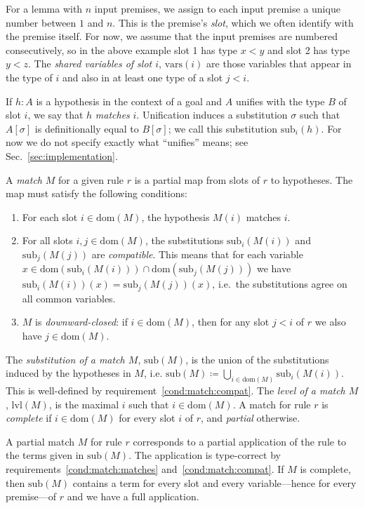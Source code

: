 \documentclass[runningheads]{llncs}
\newcommand{\vars}{\ensuremath{\mathrm{vars}}}
\newcommand{\dom}{\ensuremath{\mathrm{dom}}}
\newcommand{\sub}{\ensuremath{\mathrm{sub}}}
\newcommand{\lvl}{\ensuremath{\mathrm{lvl}}}
\begin{document}
For a lemma with $n$ input premises, we assign to each input premise a unique number between $1$ and $n$.
This is the premise's \emph{slot}, which we often identify with the premise itself.
For now, we assume that the input premises are numbered consecutively, so in the above example slot 1 has type $x < y$ and slot 2 has type $y < z$.
The \emph{shared variables of slot $i$}, $\vars(i)$ are those variables that appear in the type of $i$ and also in at least one type of a slot $j < i$.

If $h : A$ is a hypothesis in the context of a goal and $A$ unifies with the type $B$ of slot $i$, we say that $h$ \emph{matches} $i$.
Unification induces a substitution $σ$ such that $A[σ]$ is definitionally equal to $B[σ]$; we call this substitution $\sub_{i}(h)$.
For now we do not specify exactly what \enquote{unifies} means; see Sec.~\ref{sec:implementation}.

A \textit{match} $M$ for a given rule $r$ is a partial map from slots of $r$ to hypotheses.
The map must satisfy the following conditions:
\begin{enumerate}
  \item\label{cond:match:matches} For each slot $i ∈ \dom(M)$, the hypothesis $M(i)$ matches $i$.
  \item\label{cond:match:compat} For all slots $i,j ∈ \dom(M)$, the substitutions $\sub_{i}(M(i))$ and $\sub_{j}(M(j))$ are \emph{compatible}.
        This means that for each variable $x ∈ \dom(\sub_{i}(M(i))) ∩ \dom(\sub_{j}(M(j)))$ we have $\sub_{i}(M(i))(x) = \sub_{j}(M(j))(x)$, i.e.\ the substitutions agree on all common variables.
  \item\label{cond:match:closed} $M$ is \emph{downward-closed}: if $i ∈ \dom(M)$, then for any slot $j < i$ of $r$ we also have $j ∈ \dom(M)$.
\end{enumerate}
The \emph{substitution of a match $M$}, $\sub(M)$, is the union of the substitutions induced by the hypotheses in $M$, i.e. $\sub(M) ≔ ⋃_{i ∈ \dom(M)}\sub_{i}(M(i))$.
This is well-defined by requirement~\ref{cond:match:compat}.
The \textit{level of a match $M$}, $\lvl(M)$, is the maximal $i$ such that $i ∈ \dom(M)$.
A match for rule $r$ is \textit{complete} if $i ∈ \dom(M)$ for every slot $i$ of $r$, and \emph{partial} otherwise.

A partial match $M$ for rule $r$ corresponds to a partial application of the rule to the terms given in $\sub(M)$.
The application is type-correct by requirements~\ref{cond:match:matches} and~\ref{cond:match:compat}.
If $M$ is complete, then $\sub(M)$ contains a term for every slot and every variable---hence for every premise---of $r$ and we have a full application.
\end{document}
